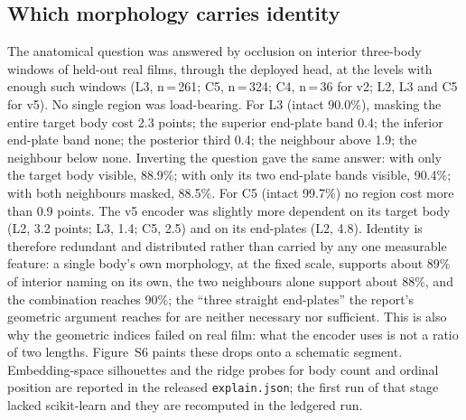 \documentclass[11pt,letterpaper]{article}
\begin{document}
\subsection*{Which morphology carries identity}
The anatomical question was answered by occlusion on interior three-body windows of held-out real films, through the deployed head, at the levels with enough such windows (L3, n\,=\,261; C5, n\,=\,324; C4, n\,=\,36 for v2; L2, L3 and C5 for v5). No single region was load-bearing. For L3 (intact 90.0\%), masking the entire target body cost 2.3 points; the superior end-plate band 0.4; the inferior end-plate band none; the posterior third 0.4; the neighbour above 1.9; the neighbour below none. Inverting the question gave the same answer: with only the target body visible, 88.9\%; with only its two end-plate bands visible, 90.4\%; with both neighbours masked, 88.5\%. For C5 (intact 99.7\%) no region cost more than 0.9 points. The v5 encoder was slightly more dependent on its target body (L2, 3.2 points; L3, 1.4; C5, 2.5) and on its end-plates (L2, 4.8). Identity is therefore redundant and distributed rather than carried by any one measurable feature: a single body's own morphology, at the fixed scale, supports about 89\% of interior naming on its own, the two neighbours alone support about 88\%, and the combination reaches 90\%; the ``three straight end-plates'' the report's geometric argument reaches for are neither necessary nor sufficient. This is also why the geometric indices failed on real film: what the encoder uses is not a ratio of two lengths. Figure~S6 paints these drops onto a schematic segment. Embedding-space silhouettes and the ridge probes for body count and ordinal position are reported in the released \texttt{explain.json}; the first run of that stage lacked scikit-learn and they are recomputed in the ledgered run.
\end{document}
